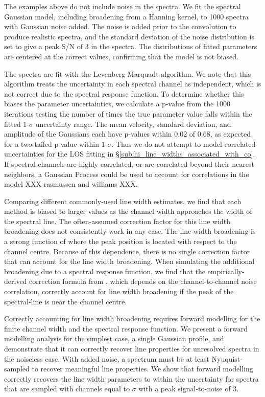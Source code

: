 \documentclass{rnaastex}
\begin{document}
The examples above do not include noise in the spectra. We fit the spectral Gaussian model, including broadening from a Hanning kernel, to 1000 spectra with Gaussian noise added.  The noise is added prior to the convolution to produce realistic spectra, and the standard deviation of the noise distribution is set to give a peak S/N of $3$ in the spectra.  The distributions of fitted parameters are centered at the correct values, confirming that the model is not biased.

The spectra are fit with the Levenberg-Marquadt algorithm.  We note that this algorithm treats the uncertainty in each spectral channel as independent, which is not correct due to the spectral response function.  To determine whether this biases the parameter uncertainties, we calculate a p-value from the 1000 iterations testing the number of times the true parameter value falls within the fitted $1\mbox{-}\sigma$ uncertainty range.  The mean velocity, standard deviation, and amplitude of the Gaussians each have p-values within $0.02$ of $0.68$, as expected for a two-tailed p-value within $1\mbox{-}\sigma$.  Thus we do not attempt to model correlated uncertainties for the \cotwoone LOS fitting in \S\ref{sub:hi_line_widths_associated_with_co}. If spectral channels are highly correlated, or are correlated beyond their nearest neighbors, a Gaussian Process could be used to account for correlations in the model XXX rasmussen and williams XXX.

Comparing different commonly-used line width estimates, we find that each method is biased to larger values as the channel width approaches the width of the spectral line.  The often-assumed correction factor for this line width broadening does not consistently work in any case.  The line width broadening is a strong function of where the peak position is located with respect to the channel centre.  Because of this dependence, there is no single correction factor that can account for the line width broadening.  When simulating the additional broadening due to a spectral response function, we find that the empirically-derived correction formula from \citet{leroy16}, which depends on the channel-to-channel noise correlation, correctly account for line width broadening if the peak of the spectral-line is near the channel centre.

Correctly accounting for line width broadening requires forward modelling for the finite channel width and the spectral response function.  We present a forward modelling analysis for the simplest case, a single Gaussian profile, and demonstrate that it can correctly recover line properties for unresolved spectra in the noiseless case.  With added noise, a spectrum must be at least Nyuquist-sampled to recover meaningful line properties.  We show that forward modelling correctly recovers the line width parameters to within the uncertainty for spectra that are sampled with channels equal to $\sigma$ with a peak signal-to-noise of $3$.
\end{document}
